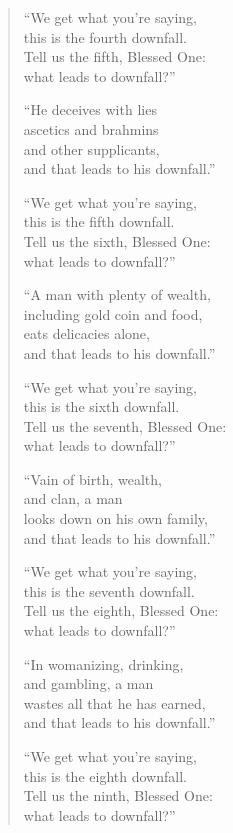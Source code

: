 \documentclass[12pt,openany]{book}%
\begin{document}
\begin{verse}
“We get what you’re saying, \\
this is the fourth downfall. \\
Tell us the fifth, Blessed One: \\
what leads to downfall?” 

“He deceives with lies \\
ascetics and brahmins \\
and other supplicants, \\
and that leads to his downfall.” 

“We get what you’re saying, \\
this is the fifth downfall. \\
Tell us the sixth, Blessed One: \\
what leads to downfall?” 

“A man with plenty of wealth, \\
including gold coin and food, \\
eats delicacies alone, \\
and that leads to his downfall.” 

“We get what you’re saying, \\
this is the sixth downfall. \\
Tell us the seventh, Blessed One: \\
what leads to downfall?” 

“Vain of birth, wealth, \\
and clan, a man \\
looks down on his own family, \\
and that leads to his downfall.” 

“We get what you’re saying, \\
this is the seventh downfall. \\
Tell us the eighth, Blessed One: \\
what leads to downfall?” 

“In womanizing, drinking, \\
and gambling, a man \\
wastes all that he has earned, \\
and that leads to his downfall.” 

“We get what you’re saying, \\
this is the eighth downfall. \\
Tell us the ninth, Blessed One: \\
what leads to downfall?” 


\end{verse}
\end{document}
